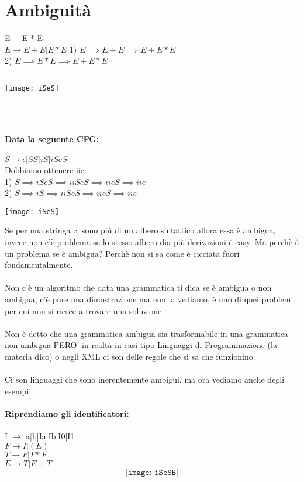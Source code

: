 \documentclass[12pt, a4paper, openany, oneside]{book}
\begin{document}
\section{Ambiguità}
E + E * E \\
$E \to E + E | E * E$
1) $E \implies E + E \implies E + E * E$ \\
2) $E \implies E * E \implies E + E * E$
\\
{\color{black} \rule{\linewidth}{0.3mm} }
\begin{center}
\texttt{[image: iSeS]}
\end{center}
{\color{black} \rule{\linewidth}{0.3mm} }
\\
\paragraph{Data la seguente CFG: } $S \to \epsilon|SS|iS|iSeS$ \\
Dobbiamo ottenere iie: \\
1) $S \implies iSeS \implies iiSeS \implies iieS \implies iie$ \\
2) $S \implies iS \implies iiSeS \implies iieS \implies iie$
\begin{center}
\texttt{[image: iSeS]}
\end{center}
Se per una stringa ci sono più di un albero sintattico allora essa è ambigua, 
invece non c'è problema se lo stesso albero dia più derivazioni è easy. Ma
perchè è un problema se è ambigua? Perchè non si sa come è cicciata fuori 
fondamentalmente.\\ \\
Non c'è un algoritmo che data una grammatica ti dica se è ambigua o non ambigua,
c'è pure una dimostrazione ma non la vediamo, è uno di quei problemi per cui
non si riesce a trovare una soluzione.\\ \\ Non è detto che una grammatica ambigua
sia trasformabile in una grammatica non ambigua PERO' in realtà in casi tipo 
Linguaggi di Programmazione (la materia dico) o negli XML ci son delle regole
che si sa che funzionino.\\ \\
Ci son linguaggi che sono inerentemente ambigui, ma ora vediamo anche degli esempi.
\paragraph{Riprendiamo gli identificatori: } I $\to$ a|b|Ia|Ib|I0|I1 \\
$F \to I | (E)$ \\
$T \to F | T * F$ \\
$E \to T | E + T$\\
$$\texttt{[image: iSeSB]}$$
\end{document}
